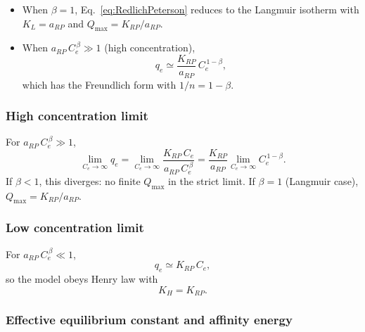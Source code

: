 	\begin{itemize}
		\item When $\beta = 1$, Eq.~\eqref{eq:RedlichPeterson} reduces to
		the Langmuir isotherm with $K_L = a_{RP}$ and
		$Q_{\max} = K_{RP}/a_{RP}$.

		\item When $a_{RP}\,C_e^{\,\beta} \gg 1$ (high concentration),
		\[
		q_e \simeq \frac{K_{RP}}{a_{RP}}\, C_e^{\,1-\beta},
		\]
		which has the Freundlich form with $1/n = 1 - \beta$.
	\end{itemize}

	\subsubsection{High concentration limit}

	For $a_{RP}\,C_e^{\,\beta} \gg 1$,
	\begin{equation}
		\lim_{C_e \to \infty} q_e
		= \lim_{C_e \to \infty} \frac{K_{RP}\, C_e}{a_{RP}\, C_e^{\,\beta}}
		= \frac{K_{RP}}{a_{RP}} \lim_{C_e \to \infty} C_e^{\,1-\beta}.
	\end{equation}
	If $\beta < 1$, this diverges: no finite $Q_{\max}$ in the strict
	limit. If $\beta = 1$ (Langmuir case), $Q_{\max} = K_{RP}/a_{RP}$.

	\subsubsection{Low concentration limit}

	For $a_{RP}\,C_e^{\,\beta} \ll 1$,
	\begin{equation}
		q_e \simeq K_{RP}\, C_e,
	\end{equation}
	so the model obeys Henry law with
	\begin{equation}
		\boxed{K_H = K_{RP}.}
	\end{equation}

	\subsubsection{Effective equilibrium constant and affinity energy}

